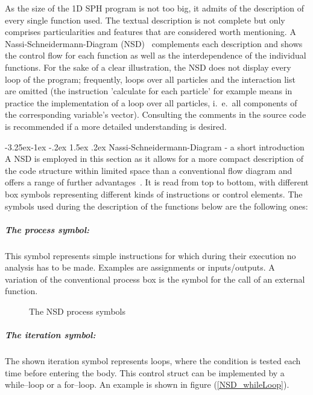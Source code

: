\documentclass{report}
\makeatletter
\renewcommand\paragraph{\@startsection{paragraph}{4}{\z@}%
  {-3.25ex\@plus -1ex \@minus -.2ex}%
  {1.5ex \@plus .2ex}%
  {\normalfont\normalsize\bfseries}}
\makeatother
\begin{document}
As the size of the 1D SPH program is not too big, it admits of the description of every single function used. The textual description is not complete but only comprises particularities and features that are considered worth mentioning. A Nassi-Schneidermann-Diagram (NSD)~\cite{Nassi1973} complements each description and shows the control flow for each function as well as the interdependence of the individual functions. For the sake of a clear illustration, the NSD does not display every loop of the program; frequently, loops over all particles and the interaction list are omitted (the instruction 'calculate for each particle' for example means in practice the implementation of a loop over all particles, i.\ e.\, all components of the corresponding variable's vector).  Consulting the comments in the source code is recommended if a more detailed understanding is desired.

\paragraph{Nassi-Schneidermann-Diagram - a short introduction}
A NSD is employed in this section as it allows for a more compact description of the code structure within limited space than a conventional flow diagram and offers a range of further advantages~\cite{Nassi1973}. It is read from top to bottom, with different box symbols representing different kinds of instructions or control elements. The symbols used during the description of the functions below are the following ones:

\subparagraph{The process symbol:}

This symbol represents simple instructions for which during their execution no analysis has to be made. Examples are assignments or inputs/outputs. 
A variation of the conventional process box is the symbol for the call of an external function.
\begin{figure}
\centering
{}
\caption{The NSD process symbols }
\end{figure}

\subparagraph{The iteration symbol:}
The shown iteration symbol represents loops, where the condition is tested each time before entering the body. This control struct can be implemented by a while--loop or a for--loop. An example is shown in figure (\ref{NSD_whileLoop}).
\end{document}
